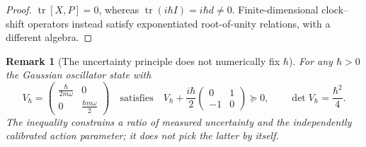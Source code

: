 \documentclass[11pt,a4paper]{article}
\newtheorem{remark}[proposition]{Remark}
\newcommand{\h}{\hbar}
\newcommand{\tr}{\operatorname{tr}}
\begin{document}
\begin{proof} $\tr[X,P]=0$, whereas $\tr(i\h I)=i\h d\ne0$. Finite-dimensional clock--shift operators instead satisfy exponentiated root-of-unity relations, with a different algebra.\end{proof}
\begin{remark}[The uncertainty principle does not numerically fix $\h$]
For any $\h>0$ the Gaussian oscillator state with
\begin{equation}
 V_{\h}=\begin{pmatrix}\frac{\h}{2m\omega}&0\\0&\frac{\h m\omega}{2}\end{pmatrix}
 \quad\text{satisfies}\quad V_{\h}+\frac{i\h}2\begin{pmatrix}0&1\\-1&0\end{pmatrix}\succeq0,
\qquad \det V_{\h}=\frac{\h^2}4.
\end{equation}
The inequality constrains a \emph{ratio} of measured uncertainty and the independently calibrated action parameter; it does not pick the latter by itself.
\end{remark}
\end{document}
